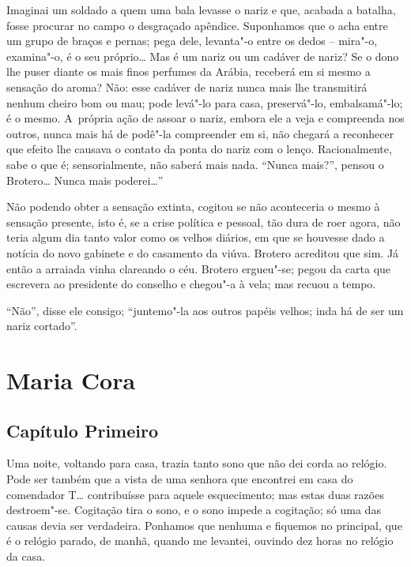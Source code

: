 Imaginai um soldado a quem uma bala levasse o nariz e que, acabada a
batalha, fosse procurar no campo o desgraçado apêndice. Suponhamos que o
acha entre um grupo de braços e pernas; pega dele, levanta"-o entre os
dedos -- mira"-o, examina"-o, é o seu próprio\ldots{} Mas é um nariz ou um
cadáver de nariz? Se o dono lhe puser diante os mais finos perfumes da
Arábia, receberá em si mesmo a sensação do aroma? Não: esse cadáver de
nariz nunca mais lhe transmitirá nenhum cheiro bom ou mau; pode levá"-lo
para casa, preservá"-lo, embalsamá"-lo; é o mesmo. A~própria ação de
assoar o nariz, embora ele a veja e compreenda nos outros, nunca mais há
de podê"-la compreender em si, não chegará a reconhecer que efeito lhe
causava o contato da ponta do nariz com o lenço. Racionalmente, sabe o
que é; sensorialmente, não saberá mais nada. ``Nunca mais?'', pensou o
Brotero\ldots{} Nunca mais poderei\ldots{}''

Não podendo obter a sensação extinta, cogitou se não aconteceria o mesmo
à sensação presente, isto é, se a crise política e pessoal, tão dura de
roer agora, não teria algum dia tanto valor como os velhos diários, em
que se houvesse dado a notícia do novo gabinete e do casamento da viúva.
Brotero acreditou que sim. Já então a arraiada vinha clareando o céu.
Brotero ergueu"-se; pegou da carta que escrevera ao presidente do
conselho e chegou"-a à vela; mas recuou a tempo.

``Não'', disse ele consigo; ``juntemo"-la aos outros papéis velhos; inda
há de ser um nariz cortado''.

\chapter{Maria Cora}

\section{Capítulo Primeiro}

\noindent Uma noite, voltando para casa, trazia tanto sono que não dei corda ao
relógio. Pode ser também que a vista de uma senhora que encontrei em
casa do comendador T\ldots{} contribuísse para aquele esquecimento; mas estas
duas razões destroem"-se. Cogitação tira o sono, e o sono impede a
cogitação; só uma das causas devia ser verdadeira. Ponhamos que nenhuma
e fiquemos no principal, que é o relógio parado, de manhã, quando me
levantei, ouvindo dez horas no relógio da casa.

